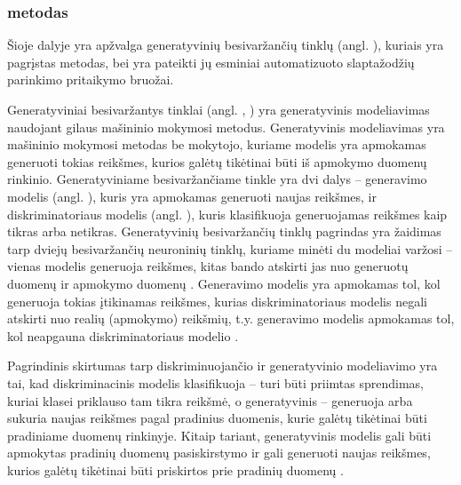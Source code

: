 \documentclass{VUMIFInfBakalaurinis}
\begin{document}
\subsubsection{ metodas}
Šioje dalyje yra apžvalga generatyvinių besivaržančių tinklų (angl. 
), kuriais yra pagrįstas 
 metodas, bei yra pateikti jų esminiai automatizuoto 
slaptažodžių parinkimo pritaikymo bruožai.

Generatyviniai besivaržantys tinklai (angl. , ) yra generatyvinis modeliavimas naudojant gilaus 
mašininio mokymosi metodus. Generatyvinis modeliavimas yra mašininio mokymosi 
metodas be mokytojo, kuriame modelis yra apmokamas generuoti tokias reikšmes, 
kurios galėtų tikėtinai būti iš apmokymo duomenų rinkinio. Generatyviniame 
besivaržančiame tinkle yra dvi dalys -- generavimo modelis (angl. 
), kuris yra apmokamas generuoti naujas reikšmes, ir 
diskriminatoriaus modelis (angl. ), kuris 
klasifikuoja generuojamas reikšmes kaip tikras arba netikras. Generatyvinių 
besivaržančių tinklų pagrindas yra žaidimas tarp dviejų besivaržančių neuroninių 
tinklų, kuriame minėti du modeliai varžosi -- vienas modelis generuoja reikšmes, 
kitas bando atskirti jas nuo generuotų duomenų ir apmokymo duomenų 
\cite{DL,GAN}. Generavimo modelis yra apmokamas tol, kol generuoja tokias 
įtikinamas reikšmes, kurias diskriminatoriaus modelis negali atskirti nuo realių 
(apmokymo) reikšmių, t.y. generavimo modelis apmokamas tol, kol neapgauna 
diskriminatoriaus modelio \cite{GAN}.

Pagrindinis skirtumas tarp diskriminuojančio ir generatyvinio modeliavimo yra 
tai, kad diskriminacinis modelis klasifikuoja -- turi būti priimtas sprendimas, 
kuriai klasei priklauso tam tikra reikšmė, o generatyvinis -- generuoja arba 
sukuria naujas reikšmes pagal pradinius duomenis, kurie galėtų tikėtinai būti 
pradiniame duomenų rinkinyje. Kitaip tariant, generatyvinis modelis gali būti 
apmokytas pradinių duomenų pasiskirstymo ir gali generuoti naujas reikšmes, 
kurios galėtų tikėtinai būti priskirtos prie pradinių duomenų \cite{PRaML}.
\end{document}
